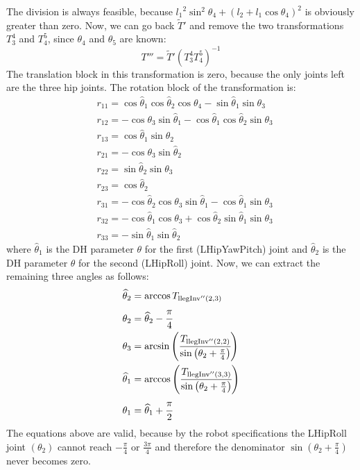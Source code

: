 The division is always feasible, because ${l_1}^2\sin^2\theta_4 + \left(l_2 + l_1\cos\theta_4\right)^2$ is obviously greater than zero. 
Now, we can go back $\widetilde{T}'$ and remove the two transformations $T^4_3$ and $T^5_4$, since $\theta_4$ and $\theta_5$ are known: 
\[
T''' = \widetilde{T}' \left(T^4_3T^5_4\right)^{-1}
\]
The translation block in this transformation is zero, because the only joints left are the three hip joints. The rotation block of the transformation is:
\begin{align*}
&r_{11} = \cos\widehat{\theta}_1\cos\widehat{\theta}_2\cos\theta_4 - \sin\widehat{\theta}_1\sin\theta_3\\
&r_{12} = -\cos\theta_3\sin\widehat{\theta}_1 - \cos\widehat{\theta}_1\cos\widehat{\theta}_2\sin\theta_3\\
&r_{13} = \cos\widehat{\theta}_1\sin\widehat{\theta}_2 \\
&r_{21} = -\cos\theta_3\sin\widehat{\theta}_2\\
&r_{22} = \sin\widehat{\theta}_2\sin\theta_3\\
&r_{23} = \cos\widehat{\theta}_2\\
&r_{31} = -\cos\widehat{\theta}_2\cos\theta_3\sin\widehat{\theta}_1 - \cos\widehat{\theta}_1\sin\theta_3\\
&r_{32} = -\cos\widehat{\theta}_1\cos\theta_3 + \cos\widehat{\theta}_2\sin\widehat{\theta}_1\sin\theta_3\\
&r_{33} = -\sin\widehat{\theta}_1\sin\widehat{\theta}_2
\end{align*}
where $\widehat{\theta}_1$ is the DH parameter $\theta$ for the first (LHipYawPitch) joint and $\widehat{\theta}_2$ is the DH parameter $\theta$ for the second (LHipRoll) joint.
Now, we can extract the remaining three angles as follows:
\begin{align*}
\widehat{\theta}_2 &= \arccos T_{\text{llegInv}''(2,3)}\\
\theta_2 &= \widehat{\theta}_2 - \cfrac{\pi}{4}\\
\theta_3 &= \arcsin\left(\cfrac{T_{\text{llegInv}''(2,2)}}{\sin\left(\theta_2+\frac{\pi}{4}\right)}\right)\\
\widehat{\theta}_1 &= \arccos\left(\cfrac{T_{\text{llegInv}''(3,3)}}{\sin\left(\theta_2+\frac{\pi}{4}\right)}\right)\\
\theta_1 &= \widehat{\theta}_1 + \cfrac{\pi}{2}
\end{align*}
The equations above are valid, because by the robot specifications the LHipRoll joint $(\theta_2)$ cannot reach $-\frac{\pi}{4}$ or $\frac{3\pi}{4}$ and therefore the denominator $\sin\left(\theta_2+\frac{\pi}{4}\right)$ never becomes zero. 

